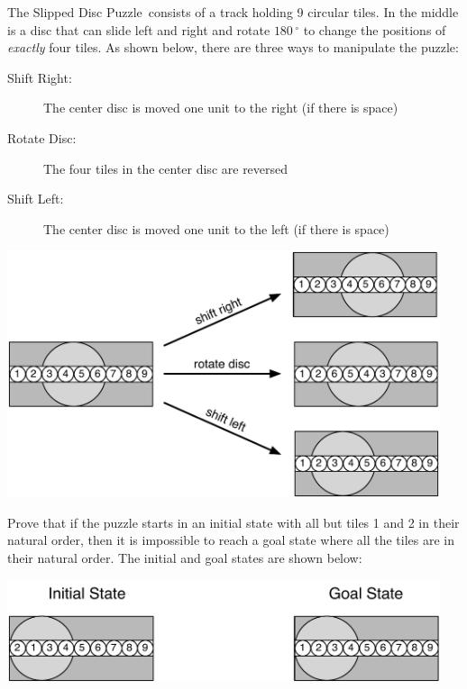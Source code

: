 \documentclass[12pt,oneside]{article}
\begin{document}
%
\begin{problem}{20}\label{slipped_disc}
The Slipped Disc Puzzle\texttrademark\ consists of a track holding 9 
circular tiles. In the middle is a disc that can slide left and right and rotate 
$180\,^{\circ}$
to change the positions of \emph{exactly} four tiles. As shown below, there are 
three ways to manipulate the puzzle:

\begin{description}
\item[Shift Right:] The center disc is moved one unit to the right (if there is space)
\item[Rotate Disc:] The four tiles in the center disc are reversed
\item[Shift Left:] The center disc is moved one unit to the left (if there is space)
\end{description} 

\begin{center}
\includegraphics[width=5in]{1d-puzzle-transitions}
\end{center}

Prove that if the puzzle starts in an initial state with all but tiles 1 
and 2 in their natural order, then it is impossible to reach a goal state 
where all the tiles are in their natural order.  The initial and goal states are shown below:

\begin{center}
\includegraphics[width=5in]{1d-puzzle-challenge}
\end{center}


\end{problem}
\end{document}
